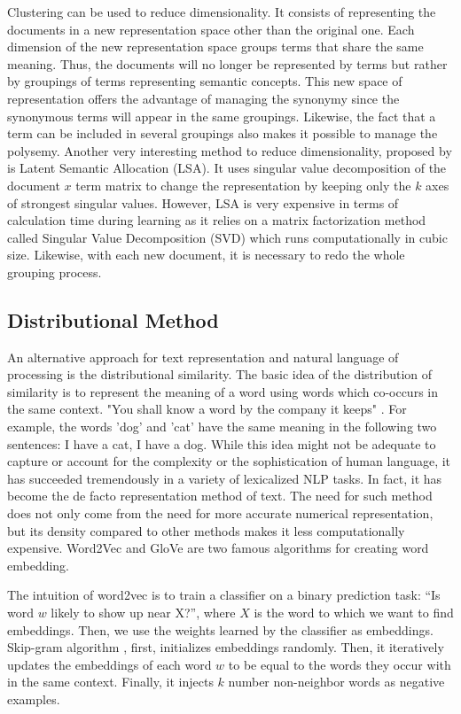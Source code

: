 Clustering \citep{baker1998distributional} \citep{sable2001using} \citep{slonim2001power} can be used to reduce dimensionality. It consists of representing the documents in a new representation space other than the original one. Each dimension of the new representation space groups terms that share the same meaning. Thus, the documents will no longer be represented by terms but rather by groupings of terms representing semantic concepts. This new space of representation offers the advantage of managing the synonymy since the synonymous terms will appear in the same groupings. Likewise, the fact that a term can be included in several groupings also makes it possible to manage the polysemy. Another very interesting method to reduce dimensionality, proposed by \citep{deerwester1990indexing} is Latent Semantic Allocation (LSA). It uses singular value decomposition of the document $x$ term matrix to change the representation by keeping only the $k$ axes of strongest singular values. However, LSA is very expensive in terms of calculation time during learning as it relies on a matrix factorization method called Singular Value Decomposition (SVD) which runs computationally in cubic size. Likewise, with each new document, it is necessary to redo the whole grouping process.

\subsection{Distributional Method}
An alternative approach for text representation and natural language of processing is the distributional similarity. The basic idea of the distribution of similarity is to represent the meaning of a word using words which co-occurs in the same context. "You shall know a word by the company it keeps" \citep{firth1957synopsis}. For example, the words 'dog' and 'cat' have the same meaning in the following two sentences: I have a cat, I have a dog. While this idea might not be adequate to capture or account for the complexity or the sophistication of human language, it has succeeded tremendously in a variety of lexicalized NLP tasks. In fact, it has become the de facto representation method of text. The need for such method does not only come from the need for more accurate numerical representation, but its density compared to other methods makes it less computationally expensive. Word2Vec \citep{mikolov2013distributed} and GloVe \citep{pennington2014glove} are two famous algorithms for creating word embedding. 

The intuition of word2vec is to train a classifier on a binary prediction task: “Is
word $w$ likely to show up near X?”, where $X$ is the word to which we want to find embeddings. Then, we use the weights learned by the classifier as embeddings. Skip-gram algorithm \citep{mikolov2013distributed} , first, initializes embeddings randomly. Then, it iteratively updates the embeddings of each word $w$ to be equal to the words they occur with in the same context. Finally, it injects $k$ number non-neighbor words as negative examples. 

